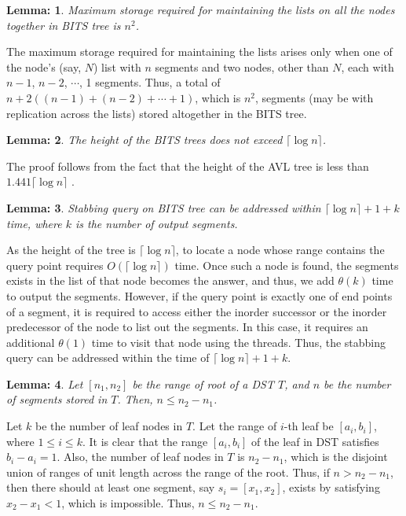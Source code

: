 \documentclass{article}
\newtheorem{lemma}{Lemma:}
\newenvironment{proof}{{\bf Proof:}}{\hfill {\fbox{}}}
\begin{document}
\begin{lemma}
Maximum storage required for maintaining the lists on all the nodes together in BITS tree is $n^2$.
\end{lemma}
\begin{proof}
The maximum storage required for maintaining the lists arises only when one of the node's (say, $N$) list with $n$ segments and two nodes, other than $N$, each with $n-1$, $n-2$, $\cdots$, 1 segments.
Thus, a total of $n+2((n-1)+(n-2)+\cdots+1)$, which is $n^2$, segments (may be with replication across the lists) stored altogether in the BITS tree. 
\end{proof}
\begin{lemma}
The height of the BITS trees does not exceed $\lceil \log n\rceil$.
\end{lemma}
\begin{proof}
The proof follows from the fact that the height of the AVL tree is less than ${1.441}\lceil \log n\rceil$ \cite{avl}.
\end{proof}
\begin{lemma}
Stabbing query on BITS tree can be addressed within $\lceil \log n\rceil+1+k$ time, where $k$ is the number of output segments.
\end{lemma}
\begin{proof}
As the height of the tree is $\lceil \log n\rceil$, to locate a node whose range contains the query point requires $O(\lceil \log n\rceil)$ time. Once such a node is found, the segments exists in the list of that node becomes the answer, and thus, we add $\theta(k)$ time to output the segments. However, if the query point is exactly one of end points of a segment, it is required to access either the inorder successor or the inorder predecessor of the node to list out the segments. In this case, it requires an additional $\theta(1)$ time to visit that node using the threads. Thus, the stabbing query can be addressed within the time of $\lceil \log n\rceil+1+k$.
\end{proof}
\begin{lemma}
Let $[n_1,n_2]$ be the range of root of a DST $T$, and $n$ be the number of segments stored in $T$. Then, $n \le n_2-n_1$.
\end{lemma}
\begin{proof}
Let $k$ be the number of leaf nodes in $T$. Let the range of $i$-th leaf be $[a_i,b_i]$, where  $1\le i\le k$. It is clear that the range $[a_i,b_i]$ of the leaf in DST satisfies $b_i-a_i=1$. Also, the number of leaf nodes in $T$ is $n_2-n_1$, which is the disjoint union of ranges of unit length across the range of the root. Thus, if $n > n_2-n_1$, then there should at least one segment, say $s_i=[x_1,x_2]$, exists by satisfying $x_2-x_1 <1$, which is impossible. Thus, $n \le n_2-n_1$.
\end{proof}
\end{document}
